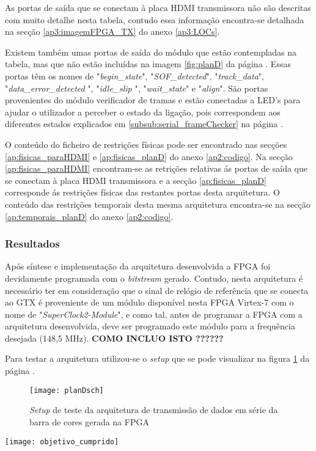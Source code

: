 As portas de saída que se conectam à placa HDMI transmissora não são descritas com muito detalhe nesta tabela, contudo essa informação encontra-se detalhada na secção \ref{ap3:imagemFPGA_TX} do anexo \ref{ap3:LOCs}.

Existem também umas portas de saída do módulo que estão contempladas na tabela, mas que não estão incluídas na imagem \ref{fig:planD} da página \pageref{fig:planD}. Essas portas têm os nomes de "\textit{begin\_state}", "\textit{SOF\_detected}", "\textit{track\_data}", "\textit{data\_error\_detected }", "\textit{idle\_slip }", "\textit{wait\_state}" e "\textit{align}". São portas provenientes do módulo verificador de tramas e estão conectadas a LED's para ajudar o utilizador a perceber o estado da ligação, pois correspondem aos diferentes estados explicados em \ref{subsub:serial_frameChecker} na página \pageref{subsub:serial_frameChecker}.


O conteúdo do ficheiro de restrições físicas pode ser encontrado nas secções \ref{ap:fisicas_paraHDMI} e \ref{ap:fisicas_planD} do anexo \ref{ap2:codigo}. Na secção \ref{ap:fisicas_paraHDMI}  encontram-se as retrições relativas ás portas de saída que se conectam à placa HDMI transmissora e a secção \ref{ap:fisicas_planD} corresponde ás restrições físicas das restantes portas desta arquitetura. O conteúdo das restrições temporais desta mesma arquitetura encontra-se na secção \ref{ap:temporais_planD} do anexo \ref{ap2:codigo}.
%
%
\subsubsection{Resultados} \label{subsub:serial_planDresults}

Após síntese e  implementação da arquitetura desenvolvida a FPGA foi devidamente programada com o \textit{bitstream} gerado. Contudo, nesta arquitetura é necessário ter em consideração que o sinal de relógio de referência que se conecta ao GTX é proveniente de um módulo disponível nesta FPGA Virtex-7 com o nome de "\textit{SuperClock2-Module}", e como tal, antes de programar a FPGA com a arquitetura desenvolvida, deve ser programado este módulo para a frequência desejada (148,5 MHz). \textbf{COMO INCLUO ISTO ??????}

Para testar a arquitetura utilizou-se o \textit{setup} que se pode visualizar na figura \ref{fig:planD_setup} da página \pageref{fig:planD_setup}.
\begin{figure}[h!]
	\begin{center}
		\leavevmode
		\texttt{[image: planDsch]}
		\captionsetup{width=1.0\linewidth}
		\caption[\textit{Setup} de teste da arquitetura]{\textit{Setup} de teste da arquitetura de transmissão de dados em série da barra de cores gerada na FPGA}
		\label{fig:planD_setup}
	\end{center}
\end{figure}
\begin{marginfigure}
	\texttt{[image: objetivo\_cumprido]}
\end{marginfigure}

